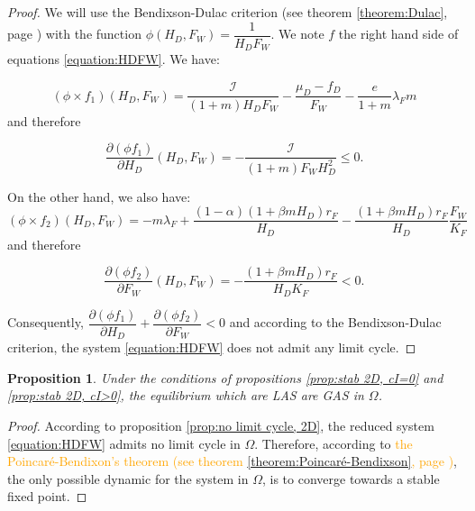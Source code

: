 \documentclass{article}
\newcommand{\lfw}{\lambda_{F}}
\newcommand{\lfw}{\lambda_{F}}
\newcommand{\cI}{\mathcal{I}}
\newcommand{\vdeux}[1]{\textcolor{orange}{#1}}
\newtheorem{prop}[theorem]{Proposition}
\theoremstyle{definition}
\theoremstyle{remark}
\begin{document}
\begin{proof}
We will use the Bendixson-Dulac criterion (see theorem \ref{theorem:Dulac}, page \pageref{theorem:Dulac}) with the function $\phi(H_D, F_W) = \dfrac{1}{H_D F_W}$. We note $f$ the right hand side of equations \eqref{equation:HDFW}. We have:

\begin{equation*}
(\phi \times f_1)(H_D, F_W) = \dfrac{\cI}{(1+m)H_D F_W} -\dfrac{\mu_D - f_D}{F_W} - \dfrac{e}{1+m}\lfw m
\end{equation*} and therefore

\begin{equation*}
\dfrac{\partial (\phi f_1)}{\partial H_D}(H_D, F_W) = - \dfrac{\cI}{(1+m)F_W H_D^2} \leq 0.
\end{equation*}

On the other hand, we also have:
\begin{equation*}
(\phi \times f_2)(H_D, F_W) = - m \lfw + \dfrac{(1-\alpha) (1+ \beta m H_D) r_F}{H_D} - \dfrac{(1+\beta m H_D) r_F}{H_D} \dfrac{F_W}{K_F}
\end{equation*} and therefore

\begin{equation*}
\dfrac{\partial (\phi f_2)}{\partial F_W}(H_D, F_W) = - \dfrac{(1+\beta m H_D) r_F}{H_D K_F} <0.
\end{equation*}

Consequently, $\dfrac{\partial (\phi f_1)}{\partial H_D} + \dfrac{\partial (\phi f_2)}{\partial F_W} < 0$ and according to the Bendixson-Dulac criterion, the system \eqref{equation:HDFW} does not admit any limit cycle.

\end{proof}


\begin{prop} \label{prop:GAS, 2D}
Under the conditions of propositions \ref{prop:stab 2D, cI=0} and \ref{prop:stab 2D, cI>0}, the equilibrium which are LAS are GAS in $\Omega$.
\end{prop}


\begin{proof}
According to proposition \ref{prop:no limit cycle, 2D}, the reduced system \eqref{equation:HDFW} admits no limit cycle in $\Omega$. Therefore, according to \vdeux{the Poincaré-Bendixon's theorem (see theorem \ref{theorem:Poincaré-Bendixson}, page \pageref{theorem:Poincaré-Bendixson})}, the only possible dynamic for the system in $\Omega$, is to converge towards a stable fixed point. 
\end{proof}
\end{document}
